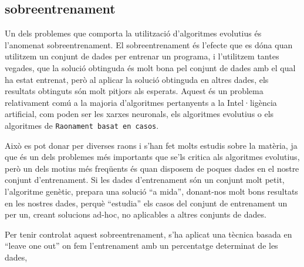 

\subsection{sobreentrenament} %
\label{sub:sobreentrenament}

Un dels problemes que comporta la utilització d'algoritmes evolutius és
l'anomenat sobreentrenament.  El sobreentrenament és l'efecte que es dóna quan
utilitzem un conjunt de dades per entrenar un programa, i l'utilitzem tantes
vegades, que la solució obtinguda és molt bona pel conjunt de dades amb el qual
ha estat entrenat, però al aplicar la solució obtinguda en altres dades, els
resultats obtinguts són molt pitjors als esperats.  Aquest és un problema
relativament comú a la majoria d'algoritmes pertanyents a la Intel·ligència
artificial, com poden ser les xarxes neuronals, els algoritmes evolutius o els
algoritmes de \texttt{Raonament basat en casos}.

Això es pot donar per diverses raons i s'han fet molts estudis sobre la
matèria, ja que és un dels problemes més importants que se'ls critica als
algoritmes evolutius, però un dels motius més freqüents és quan
disposem de poques dades en el nostre conjunt d'entrenament.  Si les dades
d'entrenament són un conjunt molt petit, l'algoritme genètic, prepara una
solució ``a mida'', donant-nos molt bons resultats en les nostres dades, perquè
``estudia'' els casos del conjunt de entrenament un per un, creant solucions
ad-hoc, no aplicables a altres conjunts de dades.

Per tenir controlat aquest sobreentrenament, s'ha aplicat una tècnica basada en
``leave one out'' on fem l'entrenament amb un percentatge determinat de les
dades, 

